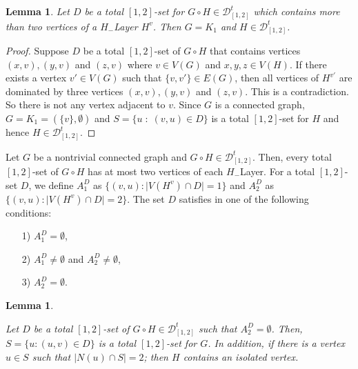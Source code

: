\documentclass[A4,12pt]{article}
\newtheorem{lemma}[theorem]{Lemma}
\theoremstyle{definition}
\theoremstyle{remark}
\begin{document}


\begin{lemma}\label{Lex3}
Let $D$ be a total $[1,2]$-set for $G \circ H \in \mathcal{D}^t_{[1,2]}$ which  contains more than two vertices of a $H_{-}$Layer $ H^v$. Then $G=K_1$ and $H \in \mathcal{D}^t_{[1,2]}$.
\end{lemma}


\begin{proof}
	Suppose $D$ be a total $[1,2]$-set of $G \circ H$ that contains vertices $(x,v), (y,v)$ and $(z,v)$ where $v\in V(G)$ and $x,y,z \in V(H)$. If there exists a vertex $v'\in V(G)$ such that $\{v,v'\}\in E(G)$, then all vertices of $H^{v'}$ are dominated by three vertices $(x,v), (y,v)$ and  $(z,v) $. This is a contradiction. So there is not any vertex adjacent to $v$.
	Since $G$ is a connected graph, $G=K_1=(\{v\},\emptyset)$ and $S=\{u\;:\;(v,u)\in D\}$ is a total $[1,2]$-set for $H$ and hence $H \in  \mathcal{D}^t_{[1,2]}$.
\end{proof}

Let $G$ be a nontrivial connected  graph and $G \circ H \in \mathcal{D}^t_{[1,2]}$. Then, every total $[1,2]$-set of  $G \circ H$ has  at most two vertices of each $H_{-}$Layer. For a total $[1,2]$-set $D$, we define
 $A_1^D$ as $\{(v,u):\vert V(H^v)\cap D\vert =1\}$ and $A_2^D$ as $\{(v,u):\vert V(H^v)\cap D\vert =2\}$.
The set $D$ satisfies in one of the following conditions:
\begin{enumerate}
  \item [1)]
  $A_1^D=\emptyset$,

\item [2)]
 $A_1^D \neq \emptyset$ and $A_2^D\neq \emptyset$,

 \item [3)]
 $A_2^D=\emptyset$.

\end{enumerate}

\begin{lemma}\label{Lex1}

Let $D$ be a total $[1,2]$-set of $G \circ H\in \mathcal{D}^t_{[1,2]}$ such that $A_2^D= \emptyset$. Then, $S=\{u:(u,v)\in D\}$ is a total $[1,2]$-set for $G$. In addition, if there is a  vertex $u \in S$ such that $\vert N(u) \cap S\vert = 2$;
 then $H$ contains an isolated vertex.
\end{lemma}
\end{document}
